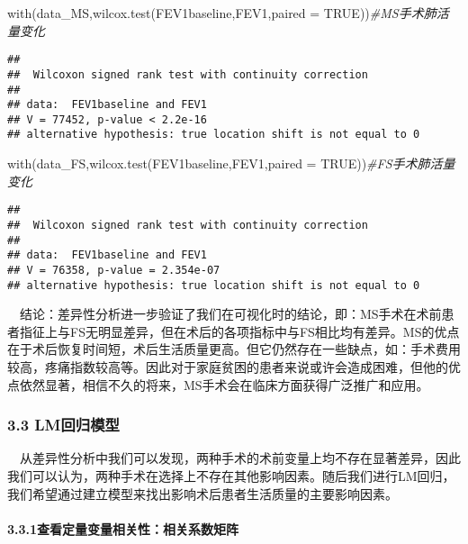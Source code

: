 \documentclass[
]{article}
\newenvironment{Shaded}{\begin{snugshade}}{\end{snugshade}}
\newcommand{\AttributeTok}[1]{\textcolor[rgb]{0.77,0.63,0.00}{#1}}
\newcommand{\CommentTok}[1]{\textcolor[rgb]{0.56,0.35,0.01}{\textit{#1}}}
\newcommand{\ConstantTok}[1]{\textcolor[rgb]{0.00,0.00,0.00}{#1}}
\newcommand{\FunctionTok}[1]{\textcolor[rgb]{0.00,0.00,0.00}{#1}}
\newcommand{\NormalTok}[1]{#1}
\begin{document}
\begin{Shaded}
\begin{Highlighting}[]
\FunctionTok{with}\NormalTok{(data\_MS,}\FunctionTok{wilcox.test}\NormalTok{(FEV1baseline,FEV1,}\AttributeTok{paired =} \ConstantTok{TRUE}\NormalTok{))}\CommentTok{\#MS手术肺活量变化}
\end{Highlighting}
\end{Shaded}

\begin{verbatim}
## 
##  Wilcoxon signed rank test with continuity correction
## 
## data:  FEV1baseline and FEV1
## V = 77452, p-value < 2.2e-16
## alternative hypothesis: true location shift is not equal to 0
\end{verbatim}

\begin{Shaded}
\begin{Highlighting}[]
\FunctionTok{with}\NormalTok{(data\_FS,}\FunctionTok{wilcox.test}\NormalTok{(FEV1baseline,FEV1,}\AttributeTok{paired =} \ConstantTok{TRUE}\NormalTok{))}\CommentTok{\#FS手术肺活量变化}
\end{Highlighting}
\end{Shaded}

\begin{verbatim}
## 
##  Wilcoxon signed rank test with continuity correction
## 
## data:  FEV1baseline and FEV1
## V = 76358, p-value = 2.354e-07
## alternative hypothesis: true location shift is not equal to 0
\end{verbatim}

 结论：差异性分析进一步验证了我们在可视化时的结论，即：MS手术在术前患者指征上与FS无明显差异，但在术后的各项指标中与FS相比均有差异。MS的优点在于术后恢复时间短，术后生活质量更高。但它仍然存在一些缺点，如：手术费用较高，疼痛指数较高等。因此对于家庭贫困的患者来说或许会造成困难，但他的优点依然显著，相信不久的将来，MS手术会在临床方面获得广泛推广和应用。

\hypertarget{lmux56deux5f52ux6a21ux578b}{%
\subsubsection{3.3 LM回归模型}\label{lmux56deux5f52ux6a21ux578b}}

 从差异性分析中我们可以发现，两种手术的术前变量上均不存在显著差异，因此我们可以认为，两种手术在选择上不存在其他影响因素。随后我们进行LM回归，我们希望通过建立模型来找出影响术后患者生活质量的主要影响因素。

\hypertarget{ux67e5ux770bux5b9aux91cfux53d8ux91cfux76f8ux5173ux6027ux76f8ux5173ux7cfbux6570ux77e9ux9635}{%
\paragraph{3.3.1查看定量变量相关性：相关系数矩阵}\label{ux67e5ux770bux5b9aux91cfux53d8ux91cfux76f8ux5173ux6027ux76f8ux5173ux7cfbux6570ux77e9ux9635}}
\end{document}
